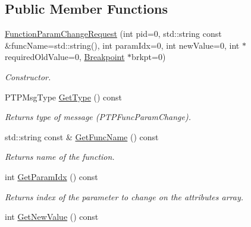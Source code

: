 \subsection*{Public Member Functions}
\begin{DoxyCompactItemize}
\item 
\hyperlink{class_common_1_1_function_param_change_request_af7dda136dbc498eee347e102b7660e05}{Function\-Param\-Change\-Request} (int pid=0, std\-::string const \&func\-Name=std\-::string(), int param\-Idx=0, int new\-Value=0, int $\ast$required\-Old\-Value=0, \hyperlink{class_common_1_1_breakpoint}{Breakpoint} $\ast$brkpt=0)
\begin{DoxyCompactList}\small\item\em Constructor. \end{DoxyCompactList}\item 
\hypertarget{class_common_1_1_function_param_change_request_a83084a194eab68eefac8f252f6069544}{P\-T\-P\-Msg\-Type \hyperlink{class_common_1_1_function_param_change_request_a83084a194eab68eefac8f252f6069544}{Get\-Type} () const }\label{class_common_1_1_function_param_change_request_a83084a194eab68eefac8f252f6069544}

\begin{DoxyCompactList}\small\item\em Returns type of message (P\-T\-P\-Func\-Param\-Change). \end{DoxyCompactList}\item 
\hypertarget{class_common_1_1_function_param_change_request_a4145f87ead31be5fefae3162497ea82d}{std\-::string const \& \hyperlink{class_common_1_1_function_param_change_request_a4145f87ead31be5fefae3162497ea82d}{Get\-Func\-Name} () const }\label{class_common_1_1_function_param_change_request_a4145f87ead31be5fefae3162497ea82d}

\begin{DoxyCompactList}\small\item\em Returns name of the function. \end{DoxyCompactList}\item 
\hypertarget{class_common_1_1_function_param_change_request_a97469c4fb80293552d3f541aef95e1c4}{int \hyperlink{class_common_1_1_function_param_change_request_a97469c4fb80293552d3f541aef95e1c4}{Get\-Param\-Idx} () const }\label{class_common_1_1_function_param_change_request_a97469c4fb80293552d3f541aef95e1c4}

\begin{DoxyCompactList}\small\item\em Returns index of the parameter to change on the attributes array. \end{DoxyCompactList}\item 
\hypertarget{class_common_1_1_function_param_change_request_a38fab3169cc0a5376eb08a3a548c84b3}{int \hyperlink{class_common_1_1_function_param_change_request_a38fab3169cc0a5376eb08a3a548c84b3}{Get\-New\-Value} () const }\label{class_common_1_1_function_param_change_request_a38fab3169cc0a5376eb08a3a548c84b3}


\end{DoxyCompactItemize}
